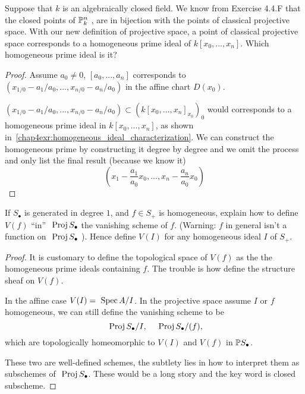 \documentclass[11pt]{book} %
\begin{document}
\begin{exr}
Suppose that $k$ is an algebraically closed field. We know from Exercise 4.4.F that the closed points of $\mathbb P^n_k$ , are in bijection with the points of classical projective space. With our new definition of projective space, a point of classical projective space corresponds to a homogeneous prime ideal of $k[x_0,...,x_n]$. Which homogeneous prime ideal is it?
\end{exr}
\begin{proof} Assume $a_0\neq 0$,
$[a_0,...,a_n]$ corresponds to $(x_{1/0}-a_1/a_0,...,x_{n/0}-a_n/a_0)$ in the affine chart $D(x_0)$.

$(x_{1/0}-a_1/a_0,...,x_{n/0}-a_n/a_0)\subset (k[x_0,...,x_n]_{x_0})_0$ would corresponds to a homogeneous prime ideal in $k[x_0,...,x_n]$, as shown in~\ref{chap4exr:homogeneous_ideal_characterization}. We can construct the homogeneous prime by constructing it degree by degree and we omit the process and only list the final result (because we know it)
$$
\left(x_1-\frac{a_1}{a_0}x_0,...,x_n-\frac{a_n}{a_0}x_0\right)
$$
\end{proof}

\begin{exr}
If $S_\bullet$ is generated in degree $1$, and $f \in S_+$ is homogeneous, explain how to define $V(f)$ ``in'' $\text{ Proj\,} S_\bullet$ the vanishing scheme of $f$. 
(Warning: $f$ in general isn’t a function on $\text{ Proj\,} S_\bullet$ ). Hence define $V(I)$ for any homogeneous ideal $I$ of $S_+$.
\end{exr}
\begin{proof}
It is customary to define the topological space of $V(f)$ as the the homogeneous prime ideals containing $f$. The trouble is how define the structure sheaf on $V(f)$. 

In the affine case $V(I)=\text{ Spec\,} A/I$. In the projective space assume $I$ or $f$ homogeneous, we can still define the vanishing scheme to be
$$
\text{ Proj\,} S_\bullet/I,\ \ \ \text{ Proj\,} S_\bullet/(f),
$$
which are topologically homeomorphic to $V(I)$ and $V(f)$ in $\mathbb P S_\bullet$.


These two are well-defined schemes,
the subtlety lies in how to interpret them as subschemes of $\text{ Proj\,} S_\bullet$. These would be a long story and the key word is closed subscheme.
\end{proof}
\end{document}
